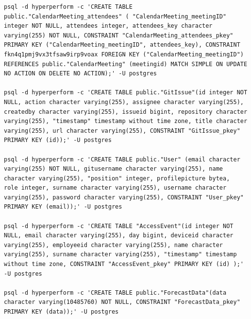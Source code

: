 \documentclass[11pt,a4paper]{article}
\begin{document}
\begin{lstlisting}
psql -d hyperperform -c 'CREATE TABLE public."CalendarMeeting_attendees" ( "CalendarMeeting_meetingID" integer NOT NULL, attendees integer, attendees_key character varying(255) NOT NULL, CONSTRAINT "CalendarMeeting_attendees_pkey" PRIMARY KEY ("CalendarMeeting_meetingID", attendees_key), CONSTRAINT fkn4q1pmj9vx3tfsaw9irp9voax FOREIGN KEY ("CalendarMeeting_meetingID") REFERENCES public."CalendarMeeting" (meetingid) MATCH SIMPLE ON UPDATE NO ACTION ON DELETE NO ACTION);' -U postgres

psql -d hyperperform -c 'CREATE TABLE public."GitIssue"(id integer NOT NULL, action character varying(255), assignee character varying(255), createdby character varying(255), issueid bigint, repository character varying(255), "timestamp" timestamp without time zone, title character varying(255), url character varying(255), CONSTRAINT "GitIssue_pkey" PRIMARY KEY (id));' -U postgres

psql -d hyperperform -c 'CREATE TABLE public."User" (email character varying(255) NOT NULL, gitusername character varying(255), name character varying(255), "position" integer, profilepicture bytea,  role integer, surname character varying(255), username character varying(255), password character varying(255), CONSTRAINT "User_pkey" PRIMARY KEY (email));' -U postgres

psql -d hyperperform -c 'CREATE TABLE "AccessEvent"(id integer NOT NULL, email character varying(255), day bigint, deviceid character varying(255), employeeid character varying(255), name character varying(255), surname character varying(255), "timestamp" timestamp without time zone, CONSTRAINT "AccessEvent_pkey" PRIMARY KEY (id) );' -U postgres

psql -d hyperperform -c 'CREATE TABLE public."ForecastData"(data character varying(10485760) NOT NULL, CONSTRAINT "ForecastData_pkey" PRIMARY KEY (data));' -U postgres


\end{lstlisting}

\pagebreak
\end{document}
